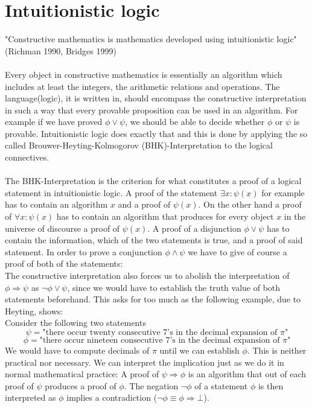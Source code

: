 \documentclass[11pt,a4paper,leqno]{report}
\numberwithin{equation}{chapter}
\begin{document}
\section{Intuitionistic logic}
"Constructive mathematics is mathematics developed using intuitionistic logic"(Richman 1990, Bridges 1999)\\
\\
Every object in constructive mathematics is essentially an algorithm which includes at least the integers, the arithmetic relations and operations. The language(logic), it is written in, should encompass the constructive interpretation in such a way that every provable proposition can be used in an algorithm. For example if we have proved $\phi\vee\psi$, we should be able to decide whether $\phi$ or $\psi$ is provable. Intuitionistic logic does exactly that and this is done by applying the so called Brouwer-Heyting-Kolmogorov (BHK)-Interpretation to the logical connectives.\\
\\
The BHK-Interpretation is the criterion for what constitutes a proof of a logical statement in intuitionistic logic. A proof of the statement $\exists x:\psi(x)$ for example has to contain an algorithm $x$ and a proof of $\psi(x)$. On the other hand a proof of $\forall x:\psi(x)$ has to contain an algorithm that produces for every object $x$ in the universe of discourse a proof of $\psi(x)$.
A proof of a disjunction $\phi\vee\psi$ has to contain the information, which of the two statements is true, and a proof of said statement. In order to prove a conjunction $\phi\wedge\psi$ we have to give of course a proof of both of the statements: \\
The constructive interpretation also forces us to abolish the interpretation of $\phi\Rightarrow\psi$ as $\neg\phi\vee\psi$, since we would have to establish the truth value of both statements beforehand. This asks for too much as the following example, due to Heyting, shows: \\Consider the following two statements 
$$\psi=\text{"there occur twenty consecutive $7$'s in the decimal expansion of $\pi$"}$$ $$\phi=\text{"there occur nineteen consecutive $7$'s in the decimal expansion of $\pi$"}$$ 
We would have to compute decimals of $\pi$ until we can establish $\phi$\cite{Dal}. This is neither practical nor necessary. We can interpret the implication just as we do it in normal mathematical practice: A proof of $\psi\Rightarrow\phi$ is an algorithm that out of each proof of $\psi$ produces a proof of $\phi$. 
The negation $\neg\phi$ of a statement $\phi$ is then interpreted as $\phi$ implies a contradiction ($\neg\phi\equiv\phi\Rightarrow\bot$). \\
\end{document}
